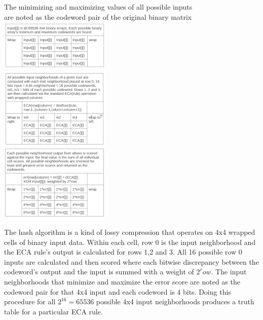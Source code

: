 \documentclass[11pt]{article}
\begin{document}
\begin{center}
 The minimizing and maximizing values of all possible inputs\\
 are noted as the codeword pair of the original binary matrix\\
\includegraphics{inputGrid}\\
\includegraphics{ecaGrid}\\
\includegraphics{errorGrid}\\
\end{center}
The hash algorithm is a kind of lossy compression that operates on 4x4 wrapped cells of binary input data. Within each cell, row 0 is the input neighborhood and the ECA rule's output is calculated for rows 1,2 and 3. All 16 possible row 0 inputs are calculated and then scored where each bitwise discrepancy between the codeword's output and the input is summed with a weight of $2^row$. The input neighborhoods that minimize and maximize the error score are noted as the codeword pair for that 4x4 input and each codeword is 4 bits. Doing this procedure for all  $2^{16}=65536$ possible 4x4 input neighborhoods produces a truth table for a particular ECA rule.\\
\end{document}
